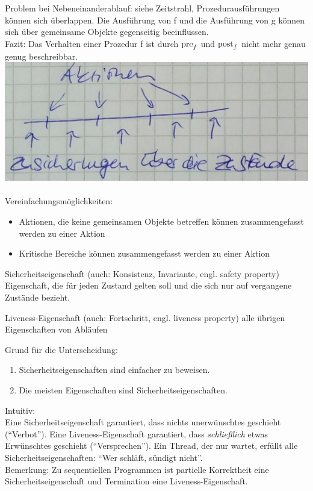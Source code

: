 Problem bei Nebeneinanderablauf: siehe Zeitstrahl, Prozedurausführungen können sich überlappen. Die Ausführung von f und die Ausführung von g können sich über gemeinsame Objekte gegenseitig beeinflussen.\\
Fazit: Das Verhalten einer Prozedur f ist durch $\operatorname{pre}_f$ und $\operatorname{post}_f$ nicht mehr genau genug beschreibbar.\\
\includegraphics[width=.6\textwidth]{Verifikation_Zeitstrahl3.jpeg}\\
\\
Vereinfachungsmöglichkeiten:
\begin{itemize}
\item Aktionen, die keine gemeinsamen Objekte betreffen können zusammengefasst werden zu einer Aktion
\item Kritische Bereiche können zusammengefasst werden zu einer Aktion
\end{itemize}

\begin{description}
\item {Sicherheitseigenschaft (auch: Konsistenz, Invariante, engl. safety property)} Eigenschaft, die für jeden Zustand gelten soll und die sich nur auf vergangene Zustände bezieht.
\item {Liveness-Eigenschaft (auch: Fortschritt, engl. liveness property)} alle übrigen Eigenschaften von Abläufen
\end{description}
Grund für die Unterscheidung:
\begin{enumerate}
\item Sicherheitseigenschaften sind einfacher zu beweisen.
\item Die meisten Eigenschaften sind Sicherheitseigenschaften.
\end{enumerate}
Intuitiv:\\
Eine Sicherheitseigenschaft garantiert, dass nichts unerwünschtes geschieht ("`Verbot"'). Eine Liveness-Eigenschaft garantiert, dass \emph{schließlich} etwas Erwünschtes geschieht ("`Versprechen"'). Ein Thread, der nur wartet, erfüllt alle Sicherheitseigenschaften: "`Wer schläft, sündigt nicht"'.\\
Bemerkung: Zu sequentiellen Programmen ist partielle Korrektheit eine Sicherheitseigenschaft und Termination eine Liveness-Eigenschaft.

